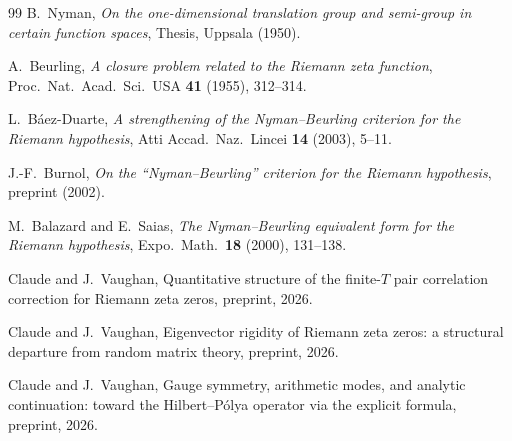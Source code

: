 \documentclass[11pt,a4paper]{article}
\begin{document}
\begin{thebibliography}{99}
 B.\ Nyman, \emph{On the one-dimensional translation group and semi-group in certain function spaces}, Thesis, Uppsala (1950).

 A.\ Beurling, \emph{A closure problem related to the Riemann zeta function}, Proc.\ Nat.\ Acad.\ Sci.\ USA \textbf{41} (1955), 312--314.

 L.\ B\'aez-Duarte, \emph{A strengthening of the Nyman--Beurling criterion for the Riemann hypothesis}, Atti Accad.\ Naz.\ Lincei \textbf{14} (2003), 5--11.

 J.-F.\ Burnol, \emph{On the ``Nyman--Beurling'' criterion for the Riemann hypothesis}, preprint (2002).

 M.\ Balazard and E.\ Saias, \emph{The Nyman--Beurling equivalent form for the Riemann hypothesis}, Expo.\ Math.\ \textbf{18} (2000), 131--138.

 Claude and J.~Vaughan, Quantitative structure of the finite-$T$ pair correlation correction for Riemann zeta zeros, preprint, 2026.

 Claude and J.~Vaughan, Eigenvector rigidity of Riemann zeta zeros: a structural departure from random matrix theory, preprint, 2026.

 Claude and J.~Vaughan, Gauge symmetry, arithmetic modes, and analytic continuation: toward the Hilbert--P\'olya operator via the explicit formula, preprint, 2026.
\end{thebibliography}
\end{document}
